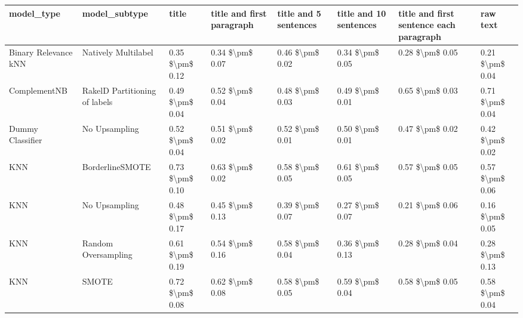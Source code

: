 \begin{tabular}{llllllll}
\toprule
                     model\_type &                 model\_subtype &           title & title and first paragraph & title and 5 sentences & title and 10 sentences & title and first sentence each paragraph &            raw text \\
\midrule
           Binary Relevance kNN &           Natively Multilabel & 0.35 \$\textbackslash pm\$ 0.12 &           0.34 \$\textbackslash pm\$ 0.07 &       0.46 \$\textbackslash pm\$ 0.02 &        0.34 \$\textbackslash pm\$ 0.05 &                         0.28 \$\textbackslash pm\$ 0.05 &     0.21 \$\textbackslash pm\$ 0.04 \\
                   ComplementNB & RakelD Partitioning of labels & 0.49 \$\textbackslash pm\$ 0.04 &           0.52 \$\textbackslash pm\$ 0.04 &       0.48 \$\textbackslash pm\$ 0.03 &        0.49 \$\textbackslash pm\$ 0.01 &                         0.65 \$\textbackslash pm\$ 0.03 &     0.71 \$\textbackslash pm\$ 0.04 \\
               Dummy Classifier &                 No Upsampling & 0.52 \$\textbackslash pm\$ 0.04 &           0.51 \$\textbackslash pm\$ 0.02 &       0.52 \$\textbackslash pm\$ 0.01 &        0.50 \$\textbackslash pm\$ 0.01 &                         0.47 \$\textbackslash pm\$ 0.02 &     0.42 \$\textbackslash pm\$ 0.02 \\
                            KNN &               BorderlineSMOTE & 0.73 \$\textbackslash pm\$ 0.10 &           0.63 \$\textbackslash pm\$ 0.02 &       0.58 \$\textbackslash pm\$ 0.05 &        0.61 \$\textbackslash pm\$ 0.05 &                         0.57 \$\textbackslash pm\$ 0.05 &     0.57 \$\textbackslash pm\$ 0.06 \\
                            KNN &                 No Upsampling & 0.48 \$\textbackslash pm\$ 0.17 &           0.45 \$\textbackslash pm\$ 0.13 &       0.39 \$\textbackslash pm\$ 0.07 &        0.27 \$\textbackslash pm\$ 0.07 &                         0.21 \$\textbackslash pm\$ 0.06 &     0.16 \$\textbackslash pm\$ 0.05 \\
                            KNN &           Random Oversampling & 0.61 \$\textbackslash pm\$ 0.19 &           0.54 \$\textbackslash pm\$ 0.16 &       0.58 \$\textbackslash pm\$ 0.04 &        0.36 \$\textbackslash pm\$ 0.13 &                         0.28 \$\textbackslash pm\$ 0.04 &     0.28 \$\textbackslash pm\$ 0.13 \\
                            KNN &                         SMOTE & 0.72 \$\textbackslash pm\$ 0.08 &           0.62 \$\textbackslash pm\$ 0.08 &       0.58 \$\textbackslash pm\$ 0.05 &        0.59 \$\textbackslash pm\$ 0.04 &                         0.58 \$\textbackslash pm\$ 0.05 &     0.58 \$\textbackslash pm\$ 0.04 \\

\end{tabular}
